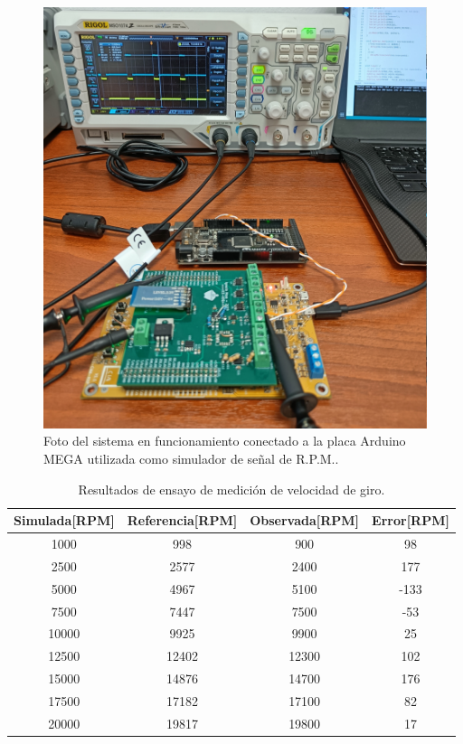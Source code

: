 \begin{figure}[htpb]
\centering
\includegraphics[width=.8\textwidth]{./Figures/foto-rpm.jpg}
\caption{Foto del sistema en funcionamiento conectado a la placa Arduino MEGA utilizada como simulador de señal de R.P.M..}
\label{fig:foto-rpm}
\end{figure}

\begin{table}[htpb]
	\centering
	\caption{Resultados de ensayo de medición de velocidad de giro.}
	\centering
	\begin{tabular}{c c c c}    
		\toprule
		\textbf{Simulada[RPM]} &  \textbf{Referencia[RPM]}   & \textbf{Observada[RPM]} & \textbf{Error[RPM]}\\
		\midrule
		1000	&	998 &	900 & 98\\
		2500	&	2577 & 2400 & 177\\
		5000	&	4967 & 5100 & -133 \\
		7500	&	7447 & 7500 & -53\\
		10000	&	9925 & 9900 & 25\\
		12500	&	12402 & 12300 & 102\\
		15000	&	14876 & 14700 & 176\\
		17500	&	17182 & 17100 & 82\\
		20000	&	19817 & 19800 & 17\\		
		\bottomrule
	\end{tabular}
	\label{tab:ensayo-rpm}
\end{table}

